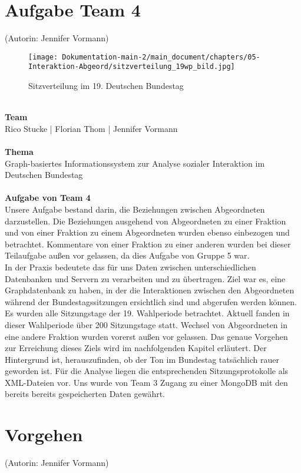 \section{Aufgabe Team 4}\label{sec:04_01_aufgabe}
(Autorin: Jennifer Vormann)\\
\begin{figure}
  \begin{center}
    \texttt{[image: Dokumentation-main-2/main\_document/chapters/05-Interaktion-Abgeord/sitzverteilung\_19wp\_bild.jpg]}
  \end{center}
  \caption{Sitzverteilung im 19. Deutschen Bundestag \cite{sitze19Bundestag}}
  \label{fig:sitzverteilung}
\end{figure}
\\
\textbf{Team} \\
Rico Stucke | Florian Thom | Jennifer Vormann\\
\\
\textbf{Thema}\\
Graph-basiertes Informationssystem zur Analyse sozialer Interaktion im Deutschen Bundestag\\
\\
\textbf{Aufgabe von Team 4}\\
Unsere Aufgabe bestand darin, die Beziehungen zwischen Abgeordneten darzustellen. Die Beziehungen ausgehend von Abgeordneten zu einer Fraktion und von einer Fraktion zu einem Abgeordneten wurden ebenso einbezogen und betrachtet. Kommentare von einer Fraktion zu einer anderen wurden bei dieser Teilaufgabe außen vor gelassen, da dies Aufgabe von Gruppe 5 war. \\
In der Praxis bedeutete das für uns Daten zwischen unterschiedlichen Datenbanken und Servern zu verarbeiten und zu übertragen. Ziel war es, eine Graphdatenbank zu haben, in der die Interaktionen zwischen den Abgeordneten während der Bundestagssitzungen ersichtlich sind und abgerufen werden können. Es wurden alle Sitzungstage der 19. Wahlperiode betrachtet. Aktuell fanden in dieser Wahlperiode über 200 Sitzungstage statt. Wechsel von Abgeordneten in eine andere Fraktion wurden vorerst außen vor gelassen. Das genaue Vorgehen zur Erreichung dieses Ziels wird im nachfolgenden Kapitel erläutert. Der Hintergrund ist, herauszufinden, ob der Ton im Bundestag tatsächlich rauer geworden ist. Für die Analyse liegen die entsprechenden Sitzungsprotokolle als XML-Dateien vor. Uns wurde von Team 3 Zugang zu einer MongoDB mit den bereits bereits gespeicherten Daten gewährt.
\section{Vorgehen}\label{sec:04_02_vorgehen}
\noindent
(Autorin: Jennifer Vormann)
